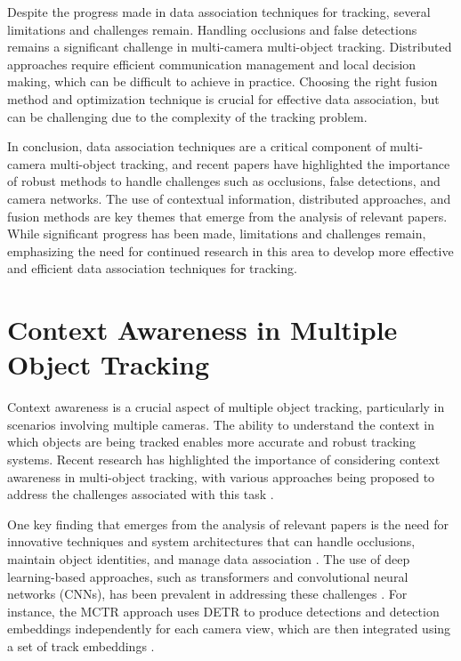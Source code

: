 \documentclass[conference]{IEEEtran}
\begin{document}
Despite the progress made in data association techniques for tracking, several limitations and challenges remain. Handling occlusions and false detections remains a significant challenge in multi-camera multi-object tracking. Distributed approaches require efficient communication management and local decision making, which can be difficult to achieve in practice. Choosing the right fusion method and optimization technique is crucial for effective data association, but can be challenging due to the complexity of the tracking problem.

In conclusion, data association techniques are a critical component of multi-camera multi-object tracking, and recent papers have highlighted the importance of robust methods to handle challenges such as occlusions, false detections, and camera networks. The use of contextual information, distributed approaches, and fusion methods are key themes that emerge from the analysis of relevant papers. While significant progress has been made, limitations and challenges remain, emphasizing the need for continued research in this area to develop more effective and efficient data association techniques for tracking.

\section{Context Awareness in Multiple Object Tracking}
Context awareness is a crucial aspect of multiple object tracking, particularly in scenarios involving multiple cameras. The ability to understand the context in which objects are being tracked enables more accurate and robust tracking systems. Recent research has highlighted the importance of considering context awareness in multi-object tracking, with various approaches being proposed to address the challenges associated with this task \cite{The Challenge of Multi-Camera Tracking}. 

One key finding that emerges from the analysis of relevant papers is the need for innovative techniques and system architectures that can handle occlusions, maintain object identities, and manage data association \cite{MCTR: Multi Camera Tracking Transformer}. The use of deep learning-based approaches, such as transformers and convolutional neural networks (CNNs), has been prevalent in addressing these challenges \cite{Learning to Track with Object Permanence}. For instance, the MCTR approach uses DETR to produce detections and detection embeddings independently for each camera view, which are then integrated using a set of track embeddings \cite{MCTR: Multi Camera Tracking Transformer}. 
\end{document}
